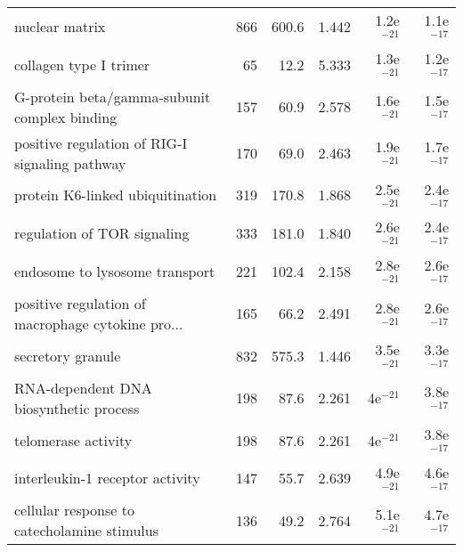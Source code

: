 \begin{longtable}{lrrrrr}
                                    nuclear matrix &                     866 &                   600.6 &      1.442 &         1.2e$^{-21}$ &         1.1e$^{-17}$ \\
                            collagen type I trimer &                      65 &                    12.2 &      5.333 &         1.3e$^{-21}$ &         1.2e$^{-17}$ \\
      G-protein beta/gamma-subunit complex binding &                     157 &                    60.9 &      2.578 &         1.6e$^{-21}$ &         1.5e$^{-17}$ \\
    positive regulation of RIG-I signaling pathway &                     170 &                    69.0 &      2.463 &         1.9e$^{-21}$ &         1.7e$^{-17}$ \\
                  protein K6-linked ubiquitination &                     319 &                   170.8 &      1.868 &         2.5e$^{-21}$ &         2.4e$^{-17}$ \\
                       regulation of TOR signaling &                     333 &                   181.0 &      1.840 &         2.6e$^{-21}$ &         2.4e$^{-17}$ \\
                    endosome to lysosome transport &                     221 &                   102.4 &      2.158 &         2.8e$^{-21}$ &         2.6e$^{-17}$ \\
 positive regulation of macrophage cytokine pro... &                     165 &                    66.2 &      2.491 &         2.8e$^{-21}$ &         2.6e$^{-17}$ \\
                                 secretory granule &                     832 &                   575.3 &      1.446 &         3.5e$^{-21}$ &         3.3e$^{-17}$ \\
            RNA-dependent DNA biosynthetic process &                     198 &                    87.6 &      2.261 &           4e$^{-21}$ &         3.8e$^{-17}$ \\
                               telomerase activity &                     198 &                    87.6 &      2.261 &           4e$^{-21}$ &         3.8e$^{-17}$ \\
                   interleukin-1 receptor activity &                     147 &                    55.7 &      2.639 &         4.9e$^{-21}$ &         4.6e$^{-17}$ \\
       cellular response to catecholamine stimulus &                     136 &                    49.2 &      2.764 &         5.1e$^{-21}$ &         4.7e$^{-17}$ \\

\end{longtable}
